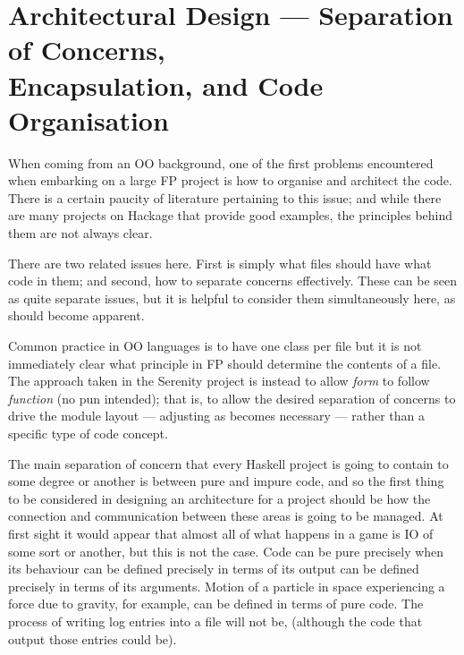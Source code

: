 \section[Architectural Design --- Separation of Concerns, Encapsulation and File Convetions]{Architectural Design --- Separation of Concerns, \\Encapsulation, and Code Organisation}


When coming from an OO background, one of the first problems encountered when embarking on a large FP project is how to organise and architect the code. There is a certain paucity of literature pertaining to this issue; and while there are many projects on Hackage that provide good examples, the principles behind them are not always clear.

There are two related issues here. First is simply what files should have what code in them; and second, how to separate concerns effectively. These can be seen as quite separate issues, but it is helpful to consider them simultaneously here, as should become apparent.

Common practice in OO languages is to have one class per file but it is not immediately clear what principle in FP should determine the contents of a file. The approach taken in the Serenity project is instead to allow \emph{form} to follow \emph{function} (no pun intended); that is, to allow the desired separation of concerns to drive the module layout --- adjusting as becomes necessary --- rather than a specific type of code concept.

The main separation of concern that every Haskell project is going to contain to some degree or another is between pure and impure code, and so the first thing to be considered in designing an architecture for a project should be how the connection and communication between these areas is going to be managed.
At first sight it would appear that almost all of what happens in a game is IO of some sort or another, but this is not the case. Code can be pure precisely when its behaviour can be defined precisely in terms of its output can be defined precisely in terms of its arguments. Motion of a particle in space experiencing a force due to gravity, for example, can be defined in terms of pure code. The process of writing log entries into a file will not be, (although the code that output those entries could be).

